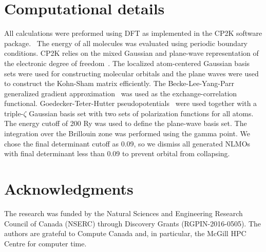 \documentclass[aps,prl,reprint,amsmath,amssymb]{revtex4-1}
\begin{document}
\section{Computational details}
All calculations were preformed using DFT as implemented in the CP2K software package.~\cite{cp2kgeneral}
The energy of all molecules was evaluated using periodic boundary conditions.
CP2K relies on the mixed Gaussian and plane-wave representation of the electronic degree of freedom~\cite{hutter2014cp2k}.
The localized atom-centered Gaussian basis sets were used for constructing molecular orbitals and the plane waves were used to construct the Kohn-Sham matrix efficiently.
The Becke-Lee-Yang-Parr generalized gradient approximation~\cite{becke1988density, lee1988development} was used as the exchange-correlation functional.
Goedecker-Teter-Hutter pseudopotentials~\cite{goedecker1996separable} were used together with a triple-$\zeta$ Gaussian basis set with two sets of polarization functions for all atoms.
The energy cutoff of 200 Ry was used to define the plane-wave basis set.
The integration over the Brillouin zone was performed using the gamma point.
We chose the final determinant cutoff as 0.09, so we dismiss all generated NLMOs with final determinant less than 0.09 to prevent orbital from collapsing.

\section{Acknowledgments} 

The research was funded by the Natural Sciences and Engineering Research Council of Canada (NSERC) through Discovery
Grants (RGPIN-2016-0505). The authors are grateful to Compute Canada and, in particular, the McGill HPC Centre for computer time.



\end{document}
